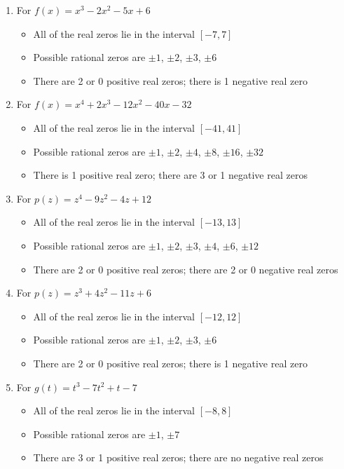 \documentclass{ximera}
\begin{document}
\begin{enumerate}

\item For $f(x) = x^{3} - 2x^{2} - 5x + 6$
\begin{itemize}
\item  All of the real zeros lie in the interval $[-7,7]$
\item  Possible rational zeros are $\pm 1$, $\pm 2$, $\pm 3$, $\pm 6$
\item  There are 2 or 0 positive real zeros;  there is 1 negative real zero
\end{itemize}

\item For  $f(x) = x^{4} + 2x^{3} - 12x^{2} - 40x - 32$
\begin{itemize}
\item  All of the real zeros lie in the interval $[-41,41]$
\item  Possible rational zeros are $\pm 1$, $\pm 2$, $\pm 4$, $\pm 8$, $\pm 16$, $\pm 32$
\item  There is 1 positive real zero;  there are 3 or 1 negative real zeros
\end{itemize}

\item For  $p(z) = z^{4} - 9z^{2} - 4z + 12$
\begin{itemize}
\item  All of the real zeros lie in the interval $[-13,13]$
\item  Possible rational zeros are $\pm 1$, $\pm 2$, $\pm 3$, $\pm 4$, $\pm 6$, $\pm 12$
\item  There are 2 or 0 positive real zeros;  there are 2 or 0 negative real zeros
\end{itemize}

\item For  $p(z) = z^{3} + 4z^{2} - 11z + 6$
\begin{itemize}
\item  All of the real zeros lie in the interval $[-12,12]$
\item  Possible rational zeros are $\pm 1$, $\pm 2$, $\pm 3$, $\pm 6$
\item  There are 2 or 0 positive real zeros;  there is 1 negative real zero
\end{itemize}

\item For   $g(t) = t^{3} - 7t^{2} + t - 7$
\begin{itemize}
\item  All of the real zeros lie in the interval $[-8,8]$
\item  Possible rational zeros are $\pm 1$, $\pm 7$
\item  There are 3 or 1 positive real zeros;  there are no negative real zeros
\end{itemize}


\end{enumerate}
\end{document}
